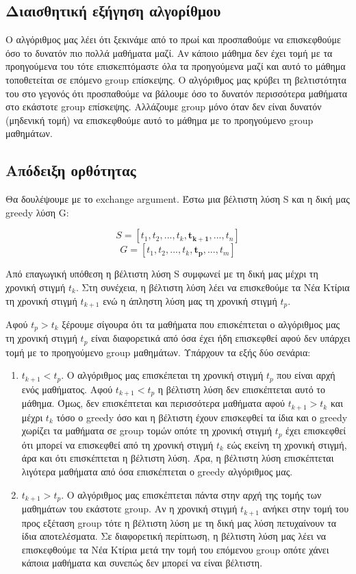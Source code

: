 \documentclass[a4paper,oneside, 11pt]{article}
\begin{document}
\subsection*{Διαισθητική εξήγηση αλγορίθμου}
Ο αλγόριθμος μας λέει ότι ξεκινάμε από το πρωί και προσπαθούμε να επισκεφθούμε όσο το δυνατόν πιο πολλά μαθήματα μαζί. Αν κάποιο μάθημα δεν έχει τομή με τα προηγούμενα του τότε επισκεπτόμαστε όλα τα προηγούμενα μαζί και αυτό το μάθημα τοποθετείται σε επόμενο group επίσκεψης. Ο αλγόριθμος μας κρύβει τη βελτιστότητα του στο γεγονός ότι προσπαθούμε να βάλουμε όσο το δυνατόν περισσότερα μαθήματα στο εκάστοτε group επίσκεψης. Αλλάζουμε group μόνο όταν δεν είναι δυνατόν (μηδενική τομή) να επισκεφθούμε αυτό το μάθημα με το προηγούμενο group μαθημάτων.

\subsection*{Απόδειξη ορθότητας}
Θα δουλέψουμε με το exchange argument. Έστω μια βέλτιστη λύση S και η δική μας greedy λύση G:

$$S = [t_1,t_2, ..., t_k, \mathbf{t_{k+1}}, ..., t_n]$$
$$G = [t_1, t_2, ..., t_k, \mathbf{t_p}, ..., t_m]$$

Από επαγωγική υπόθεση η βέλτιστη λύση S συμφωνεί με τη δική μας μέχρι τη χρονική στιγμή $t_k$. Στη συνέχεια, η βέλτιστη λύση λέει να επισκεθούμε τα Νέα Κτίρια τη χρονική στιγμή $t_{k+1}$ ενώ η άπληστη λύση μας τη χρονική στιγμή $t_{p}$.

Αφού $t_p > t_k$ ξέρουμε σίγουρα ότι τα μαθήματα που επισκέπτεται ο αλγόριθμος μας τη χρονική στιγμή $t_p$ είναι διαφορετικά από όσα έχει ήδη επισκεφθεί αφού δεν υπάρχει τομή με το προηγούμενο group μαθημάτων. Υπάρχουν τα εξής δύο σενάρια:

\begin{enumerate}
	\item $t_{k+1} < t_p$. \bigbreak 
	Ο αλγόριθμος μας επισκέπεται τη χρονική στιγμή $t_p$ που είναι αρχή ενός μαθήματος. Αφού $t_{k+1} < t_p$ η βέλτιστη λύση δεν επισκέπτεται αυτό το μάθημα. Όμως, δεν επισκέπτεται και περισσότερα μαθήματα αφού $t_{k+1} > t_k$ και μέχρι $t_{k}$ τόσο ο greedy όσο και η βέλτιστη έχουν επισκεφθεί τα ίδια και ο greedy χωρίζει τα μαθήματα σε group τομών οπότε τη χρονική στιγμή $t_p$ έχει επισκεφθεί ότι μπορεί να επισκεφθεί από τη χρονική στιγμή $t_k$ εώς εκείνη τη χρονική στιγμή, άρα και ότι επισκέπτεται η βέλτιστη λύση. Άρα, η βέλτιστη λύση επισκέπτεται λιγότερα μαθήματα από όσα επισκέπτεται ο greedy αλγόριθμος μας.
	\item $t_{k+1} > t_p$. \bigbreak 
	Ο αλγόριθμος μας επισκέπτεται πάντα στην αρχή της τομής των μαθημάτων του εκάστοτε group. Αν η χρονική στιγμή $t_{k+1}$ ανήκει στην τομή του προς εξέταση group τότε η βέλτιστη λύση με τη δική μας λύση πετυχαίνουν τα ίδια αποτελέσματα. Σε διαφορετική περίπτωση, η βέλτιστη λύση μας λέει να επισκεφθούμε τα Νέα Κτίρια μετά την τομή του επόμενου group οπότε χάνει κάποια μαθήματα και συνεπώς δεν μπορεί να είναι βέλτιστη.
\end{enumerate}
\end{document}
